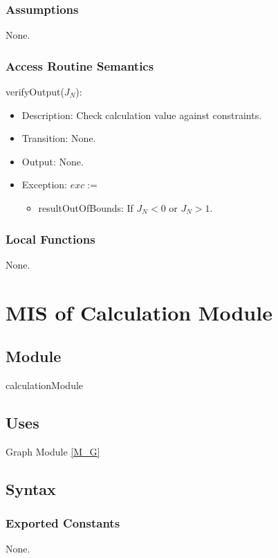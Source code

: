 \documentclass[12pt, titlepage]{article}
\begin{document}
\subsubsection{Assumptions}
None.

\subsubsection{Access Routine Semantics}

\noindent verifyOutput($J_N$):
\begin{itemize}
\item Description: Check calculation value against constraints.
\item Transition: None.
\item Output: None.
\item Exception: $exc:=$
\begin{itemize}
\item resultOutOfBounds: If $J_N < 0$ or $J_N > 1$.
\end{itemize}
\end{itemize}


\subsubsection{Local Functions}
None.

\newpage
\section{MIS of Calculation Module} \label{M_CA}

\subsection{Module}
calculationModule

\subsection{Uses}
Graph Module \ref{M_G}

\subsection{Syntax}
\subsubsection{Exported Constants}
None.
\end{document}

